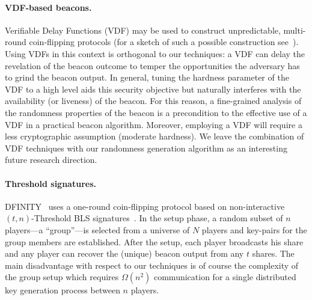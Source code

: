 \paragraph{VDF-based beacons.} 
Verifiable Delay Functions (VDF)
\cite{vdf-boneh,vdf-wesolowski,vdf-pietrzak} may be used to construct
unpredictable, multi-round coin-flipping protocols (for a sketch of
such a possible construction see~\cite{vdf-ethereum}). Using VDFs in
this context is orthogonal to our techniques: a VDF can delay the
revelation of the beacon outcome to temper the opportunities the
adversary has to grind the beacon output. In general, tuning the
hardness parameter of the VDF to a high level aids this security
objective but naturally interferes with the availability (or liveness)
of the beacon.
For this reason, a fine-grained analysis of the
randomness properties of the beacon is a precondition to the effective
use of a VDF in a practical beacon algorithm. Moreover, employing a
VDF will require a less cryptographic assumption (moderate hardness).
We leave the combination of VDF techniques with our randomness
generation algorithm as an interesting future research direction.

\paragraph{Threshold signatures.}
DFINITY~\cite{Dfinity} uses a one-round coin-flipping protocol based
on non-interactive $(t,n)$-Threshold BLS signatures~\cite{BLS}. 
In the setup phase, a random subset of $n$
players---a ``group''---is selected from a universe of $N$
players  
and 
key-pairs for the group members are established. 
After the setup, 
each player broadcasts his share 
and any player can
recover the (unique) beacon output from any $t$ shares.
%
The main disadvantage with respect to our techniques is of course
the complexity of the group setup which requires $\Omega(n^2)$ communication
for a single distributed key generation process between $n$ players.

